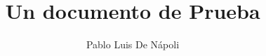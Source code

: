 \documentclass {article}
\begin{document}
 
	\title{Un documento de Prueba} 
	\author{Pablo Luis De Nápoli} 
	\maketitle 

	
\end{document}
